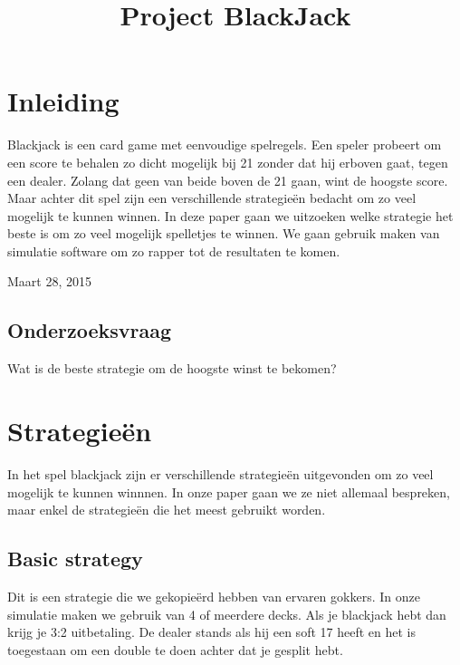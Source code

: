 \documentclass[conference]{IEEEtran}
\begin{document}
\title{Project BlackJack}
\author{
}
\maketitle

\IEEEpeerreviewmaketitle

\section{Inleiding}
Blackjack is een card game met eenvoudige spelregels. Een speler probeert om een score te behalen zo dicht mogelijk bij 21 zonder dat hij erboven gaat, tegen een dealer. Zolang dat geen van beide boven de 21 gaan, wint de hoogste score. Maar achter dit spel zijn een verschillende strategie\"en bedacht om zo veel mogelijk te kunnen winnen. In deze paper gaan we uitzoeken welke strategie het beste is om zo veel mogelijk spelletjes te winnen. We gaan gebruik maken van simulatie software om zo rapper tot de resultaten te komen.
 
\hfill Maart 28, 2015

\subsection{Onderzoeksvraag}
Wat is de beste strategie om de hoogste winst te bekomen?



\section{Strategie\"en}
In het spel blackjack zijn er verschillende strategie\"en uitgevonden om zo veel mogelijk te kunnen winnnen. In onze paper gaan we ze niet allemaal bespreken, maar enkel de strategie\"en die het meest gebruikt worden.


\subsection{Basic strategy}

Dit is een strategie die we gekopie\"erd hebben van ervaren gokkers. In onze simulatie maken we gebruik van 4 of meerdere decks. Als je blackjack hebt dan krijg je 3:2 uitbetaling. De dealer stands als hij een soft 17 heeft en het is toegestaan om een double te doen achter dat je gesplit hebt. 
\end{document}
